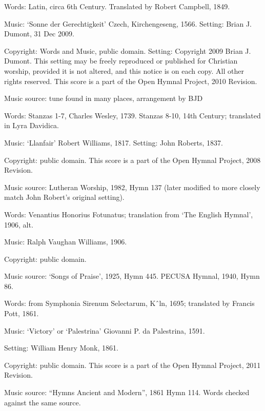 \begin{multicols}{2}
\par\noindent
Words: Latin, circa 6th Century. Translated by Robert Campbell, 1849. 
\par\noindent
Music: `Sonne der Gerechtigkeit' Czech, Kirchengeseng, 1566.  Setting: Brian J. Dumont, 31 Dec 2009.
\par\noindent
Copyright: Words and Music, public domain. Setting: Copyright 2009 Brian J. Dumont. This setting may be freely reproduced or published for Christian worship, provided it is not altered, and this notice is on each copy. All other rights reserved.   This score is a part of the Open Hymnal Project, 2010 Revision.
\par\noindent
Music source: tune found in many places, arrangement by BJD

\par\noindent
Words: Stanzas 1-7, Charles Wesley, 1739. Stanzas 8-10, 14th Century; translated in Lyra Davidica. 
\par\noindent
Music: `Llanfair' Robert Williams, 1817.  Setting: John Roberts, 1837.
\par\noindent
Copyright: public domain. This score is a part of the Open Hymnal Project, 2008 Revision.
\par\noindent
Music source: Lutheran Worship, 1982, Hymn 137 (later modified to more closely match John Robert's original setting).

\par\noindent
Words: Venantius Honorius Fotunatus; translation from `The English Hymnal', 1906, alt.
\par\noindent
Music: Ralph Vaughan Williams, 1906.
\par\noindent
Copyright: public domain.
\par\noindent
Music source: `Songs of Praise', 1925, Hymn 445. PECUSA Hymnal, 1940, Hymn 86.

\par\noindent
Words: from Symphonia Sirenum Selectarum, Kˆln, 1695; translated by Francis Pott, 1861.
\par\noindent
Music: `Victory' or  `Palestrina' Giovanni P. da Palestrina, 1591.
\par\noindent
Setting: William Henry Monk, 1861.
\par\noindent
Copyright: public domain.  This score is a part of the Open Hymnal Project, 2011 Revision.
\par\noindent
Music source: ``Hymns Ancient and Modern'', 1861 Hymn 114.  Words checked against the same source.



\end{multicols}
